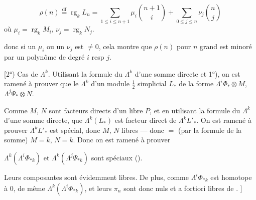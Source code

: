 \[
\rho(n)\overset{\mathrm{df}}=\operatorname{rg}_kL_n
=\sum_{1\leq i\leq n+1}\mu_i\binom{n+1}{i}
+\sum_{0\leq j\leq n}\nu_j\binom{n}{j}
\]
où $\mu_i=\operatorname{rg}_kM_i$, $\nu_j=\operatorname{rg}_kN_j$.

donc si  un $\mu_i$ ou un $\nu_j$
est $\neq0$, cela montre que $\rho(n)$ pour
$n$ grand est minoré par un polynôme
de degré $i$ resp $j$.

[2°) Cas de $\Lambda^k$. Utilisant la formule
du $\Lambda^k$ d'une somme directe et
1°), on est ramené à prouver que
le $\Lambda^k$ d'un module $\frac12$ simplicial
$L_*$ de la forme $\Lambda^i\Phi_*\otimes M$, $\Lambda^j\Psi_*\otimes N$.

Comme $M$, $N$ sont facteurs directs d'un
libre $P$, 
 
et en utilisant la
formule du $\Lambda^k$ d'une somme directe,
 que $\Lambda^k(L_*)$ est facteur
direct de $\Lambda^kL'_*$. On est ramené à
prouver $\Lambda^kL'_*$ est  spécial, donc
 $M$, $N$ libres --- donc $=$ (par la
formule de la somme) $M=k$, $N=k$.
Donc on est ramené à prouver

$\Lambda^k(\Lambda^i\Phi_{*k})$ et $\Lambda^k(\Lambda^j\Psi_{*k})$ sont spéciaux
().

Leurs composantes sont évidemment
libres. De plus, comme $\Lambda^i\Phi_{*k}$ est
homotope à $0$, de même $\Lambda^k(\Lambda^i\Phi_{*k})$, et
leurs $\pi_n$ sont donc nuls et a fortiori
libres de .
]

